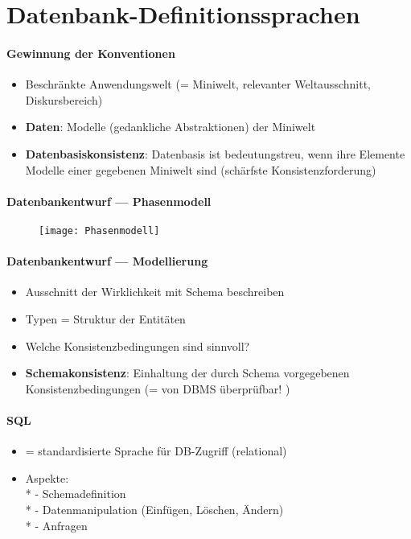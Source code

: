 \section{Datenbank-Definitionssprachen}
\label{sec:definitionssprachen}

\paragraph{Gewinnung der Konventionen}
\begin{itemize}
	\item Beschränkte Anwendungswelt (= Miniwelt, relevanter Weltausschnitt, Diskursbereich)
	\item \textbf{Daten}: Modelle (gedankliche Abstraktionen) der Miniwelt
	\item \textbf{Datenbasiskonsistenz}: Datenbasis ist bedeutungstreu, wenn ihre Elemente Modelle einer gegebenen Miniwelt sind (schärfste Konsistenzforderung)
\end{itemize}

\paragraph{Datenbankentwurf --- Phasenmodell}
\begin{figure}[H]\centering\label{Phasenmodell}\texttt{[image: Phasenmodell]}\end{figure}

\paragraph{Datenbankentwurf --- Modellierung}
\begin{itemize}
	\item Ausschnitt der Wirklichkeit mit Schema beschreiben
	\item Typen = Struktur der Entitäten
	\item Welche Konsistenzbedingungen sind sinnvoll?
	\item \textbf{Schemakonsistenz}: Einhaltung der durch Schema vorgegebenen Konsistenzbedingungen (= von DBMS überprüfbar! )
\end{itemize}

\paragraph{SQL}
\begin{itemize}
	\item = standardisierte Sprache für DB-Zugriff (relational)
	\item Aspekte: \\*
		- Schemadefinition \\*
		- Datenmanipulation (Einfügen, Löschen, Ändern) \\*
		- Anfragen
\end{itemize}



